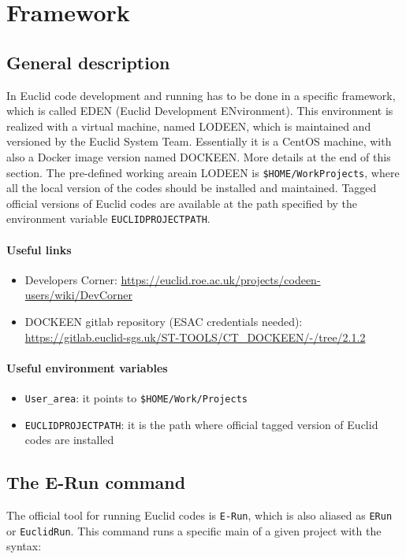 \section{Framework}\label{sec:framework}
\subsection{General description}
In Euclid code development and running has to be done in a specific framework, which is called EDEN (Euclid Development ENvironment). This environment is realized with a virtual machine, named LODEEN, which is maintained and versioned by the Euclid System Team. Essentially it is a CentOS machine, with also a Docker image version named DOCKEEN. More details at the end of this section.
The pre-defined working areain LODEEN is \verb+$HOME/WorkProjects+, where all the local version of the codes should be installed and maintained. Tagged official versions of Euclid codes are available at the path specified by the environment variable \verb+EUCLIDPROJECTPATH+.

\paragraph{Useful links}
\begin{itemize}
\item Developers Corner: \url{https://euclid.roe.ac.uk/projects/codeen-users/wiki/DevCorner}
\item DOCKEEN gitlab repository (ESAC credentials needed): \url{https://gitlab.euclid-sgs.uk/ST-TOOLS/CT_DOCKEEN/-/tree/2.1.2}
\end{itemize}

\paragraph{Useful environment variables}
\begin{itemize}
\item \verb+User_area+: it points to \verb+$HOME/Work/Projects+
\item \verb+EUCLIDPROJECTPATH+: it is the path where official tagged version of Euclid codes are installed
\end{itemize}


\subsection{The E-Run command}
The official tool for running Euclid codes is \verb+E-Run+, which is also aliased as \verb+ERun+ or \verb+EuclidRun+. This command runs a specific main of a given project with the syntax:

